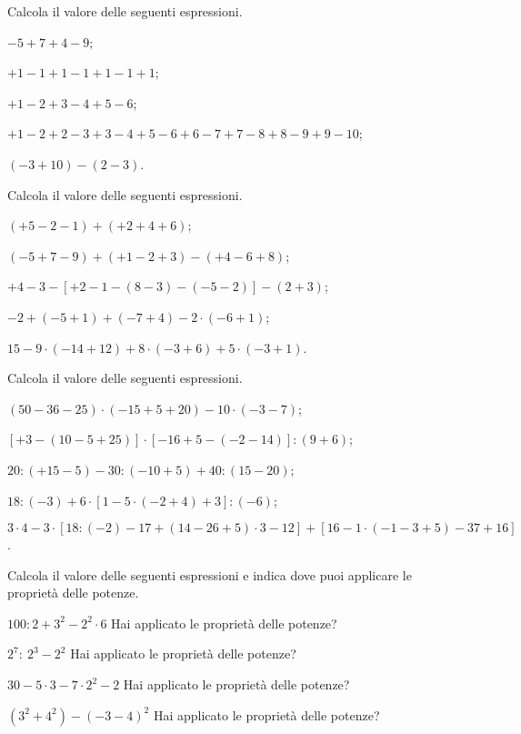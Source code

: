 \begin{esercizio}[\Ast]
Calcola il valore delle seguenti espressioni.
 \begin{enumeratea}
 \item $-5+7+4-9$;
 \item $+1-1+1-1+1-1+1$;
 \item $+1-2+3-4+5-6$;
 \item $+1-2+2-3+3-4+5-6+6-7+7-8+8-9+9-10$;
 \item $(-3+10)-(2-3)$.
 \end{enumeratea}
\end{esercizio}

\begin{esercizio}[\Ast]
Calcola il valore delle seguenti espressioni.
 \begin{enumeratea}
 \item $(+5-2-1)+(+2+4+6)$;
 \item $(-5+7-9)+(+1-2+3)-(+4-6+8)$;
 \item $+4-3-[+2-1-(8-3)-(-5-2)]-(2+3)$;
 \item $-2+(-5+1)+(-7+4)-2 \cdot (-6+1)$;
 \item $15-9 \cdot (-14+12)+8 \cdot (-3+6)+ 5 \cdot(-3+1)$.
 \end{enumeratea}
\end{esercizio}

\begin{esercizio}[\Ast]
Calcola il valore delle seguenti espressioni.
 \begin{enumeratea}
 \item $(50-36-25)\cdot (-15+5+20)-10\cdot (-3-7)$;
 \item $[+3-(10-5+25)]\cdot [-16+5-(-2-14)]:(9+6)$;
 \item $20:(+15-5)-30:(-10+5)+40:(15-20)$;
 \item $18:(-3)+6\cdot [1-5\cdot (-2+4)+3]: (-6)$;
 \item $3\cdot 4-3\cdot [18:(-2)-17+(14-26+5)\cdot 3-12]+[16-1\cdot (-1-3+5)-37+16]$.
\end{enumeratea}
\end{esercizio}

\begin{esercizio}[\Ast]
Calcola il valore delle seguenti espressioni e indica dove puoi applicare le proprietà delle potenze.
\TabPositions{3.5cm}
\begin{enumeratea}
 \item $100:2+3^2 -2^2\cdot 6$ \tab Hai applicato le proprietà delle potenze?\:\dotfill
 \item $2^7:~2^3 -2^2$ \tab Hai applicato le proprietà delle potenze?\:\dotfill
 \item $30-5\cdot 3 -7\cdot 2^2 -2$ \tab Hai applicato le proprietà delle potenze?\:\dotfill
 \item $(3^2 +4^2) -(-3-4)^2$ \tab Hai applicato le proprietà delle potenze?\:\dotfill
\end{enumeratea}
\end{esercizio}

